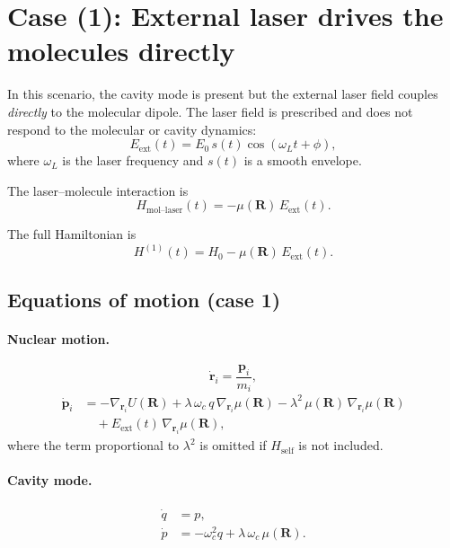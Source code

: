 \documentclass[11pt]{article}
\begin{document}
\section{Case (1): External laser drives the molecules directly}

In this scenario, the cavity mode is present but the external laser field
couples \emph{directly} to the molecular dipole. The laser field is prescribed
and does not respond to the molecular or cavity dynamics:
\begin{equation}
E_{\text{ext}}(t)=E_0\,s(t)\cos(\omega_L t+\phi),
\end{equation}
where $\omega_L$ is the laser frequency and $s(t)$ is a smooth envelope.

The laser--molecule interaction is
\begin{equation}
H_{\text{mol--laser}}(t)= -\mu(\bm R)\,E_{\text{ext}}(t).
\end{equation}

The full Hamiltonian is
\begin{equation}
H^{(1)}(t)=H_0-\mu(\bm R)\,E_{\text{ext}}(t).
\end{equation}

\subsection*{Equations of motion (case 1)}

\paragraph{Nuclear motion.}
\begin{equation}
\dot{\bm r}_i=\frac{\bm p_i}{m_i},
\end{equation}
\begin{align}
\dot{\bm p}_i &=
-\nabla_{\bm r_i}U(\bm R)
+\lambda\,\omega_c\, q\,\nabla_{\bm r_i}\mu(\bm R)
-\lambda^2\,\mu(\bm R)\,\nabla_{\bm r_i}\mu(\bm R)
\nonumber\\
&\quad
+E_{\text{ext}}(t)\,\nabla_{\bm r_i}\mu(\bm R),
\end{align}
where the term proportional to $\lambda^2$ is omitted if $H_{\text{self}}$
is not included.

\paragraph{Cavity mode.}
\begin{align}
\dot q &= p,\\
\dot p &= -\omega_c^2 q + \lambda\,\omega_c\,\mu(\bm R).
\end{align}
\end{document}
